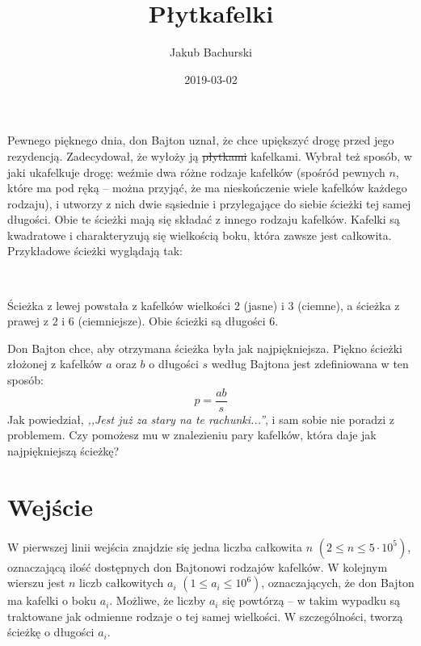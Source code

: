 \documentclass[zad,zawodnik,utf8]{sinol}
\title{Płytkafelki}
\date{2019-03-02}
\author{Jakub Bachurski}
\begin{document}
\begin{tasktext}%
\par Pewnego pięknego dnia, don Bajton uznał, że chce upiększyć drogę przed jego rezydencją. Zadecydował, że wyłoży ją \sout{płytkami} kafelkami. Wybrał też sposób, w jaki ukafelkuje drogę: weźmie dwa różne rodzaje kafelków (spośród pewnych $n$, które ma pod ręką -- można przyjąć, że ma nieskończenie wiele kafelków każdego rodzaju), i utworzy z nich dwie sąsiednie i przylegające do siebie ścieżki tej samej długości. Obie te ścieżki mają się składać z innego rodzaju kafelków. Kafelki są kwadratowe i charakteryzują się wielkością boku, która zawsze jest całkowita. Przykładowe ścieżki wyglądają tak:
\begin{center}
\ \ \ \ \
\end{center}

\par Ścieżka z lewej powstała z kafelków wielkości 2 (jasne) i 3 (ciemne), a ścieżka z prawej z 2 i 6 (ciemniejsze). Obie ścieżki są długości 6.

\par Don Bajton chce, aby otrzymana ścieżka była jak najpiękniejsza. Piękno ścieżki złożonej z kafelków $a$ oraz $b$ o długości $s$ według Bajtona jest zdefiniowana w ten sposób:
\[ p = \frac{ab}{s}  \]
Jak powiedział, \textit{,,Jest już za stary na te rachunki...''}, i sam sobie nie poradzi z problemem. Czy pomożesz mu w znalezieniu pary kafelków, która daje jak najpiękniejszą ścieżkę?

\section{Wejście}
\par W pierwszej linii wejścia znajdzie się jedna liczba całkowita $n$ $(2 \le n \le 5 \cdot 10^5)$, oznaczającą ilość dostępnych don Bajtonowi rodzajów kafelków. W kolejnym wierszu jest $n$ liczb całkowitych $a_i$ $(1 \le a_i \le 10^6)$, oznaczających, że don Bajton ma kafelki o boku $a_i$. Możliwe, że liczby $a_i$ się powtórzą -- w takim wypadku są traktowane jak odmienne rodzaje o tej samej wielkości. W szczególności, tworzą ścieżkę o długości $a_i$.


\end{tasktext}
\end{document}
